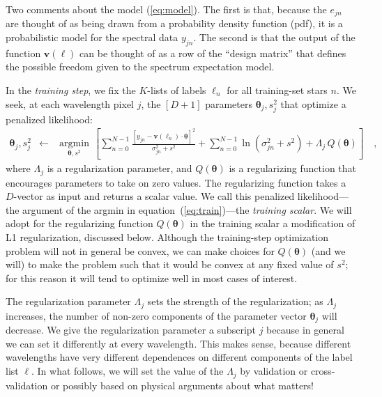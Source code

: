 \documentclass[12pt,preprint]{aastex}
\newcommand{\Dvector}[1]{\boldsymbol{#1}}
\newcommand{\vectheta}{\Dvector{\theta}}
\newcommand{\vecv}{\Dvector{v}}
\newcommand{\argmin}[1]{\underset{#1}{\operatorname{argmin}}\,}
\begin{document}
Two comments about the model (\ref{eq:model}).
The first is that, because the $e_{jn}$ are thought of as being drawn from a 
probability density function (pdf), it is a probabilistic model for the spectral
data $y_{jn}$.
The second is that the output of the function $\vecv(\ell)$ can be thought
of as a row of the ``design matrix'' that defines the possible freedom
given to the spectrum expectation model.

In the \emph{training step}, we fix the $K$-lists of labels $\ell_n$
for all training-set stars $n$.
We seek, at each wavelength pixel $j$, the $[D+1]$ parameters
$\vectheta_j,s^2_j$ that optimize a penalized likelihood:
\begin{eqnarray}\label{eq:train}
  \vectheta_j,s^2_j &\leftarrow& \argmin{\vectheta,s^2}\left[
    \sum_{n=0}^{N-1} \frac{[y_{jn}-\vecv(\ell_n)\cdot\vectheta]^2}{\sigma^2_{jn}+s^2}
    + \sum_{n=0}^{N-1} \ln(\sigma^2_{jn}+s^2)
    + \Lambda_j\,Q(\vectheta)
    \right]
  \quad ,
\end{eqnarray}
where $\Lambda_j$ is a regularization parameter, and $Q(\vectheta)$ is a 
regularizing function that encourages parameters to take on zero values.
The regularizing function takes a $D$-vector as input and returns a
scalar value.
We call this penalized likelihood---the argument of the
argmin in equation~(\ref{eq:train})---the \emph{training scalar}.
We will adopt for the regularizing function $Q(\vectheta)$ in the training scalar a
modification of L1 regularization, discussed below.
Although the training-step optimization problem will not in general be
convex, we can make choices for $Q(\vectheta)$ (and we will) to make the
problem such that it would be convex at any fixed value of $s^2$; for
this reason it will tend to optimize well in most cases of interest.

The regularization parameter $\Lambda_j$ sets the strength of the
regularization; as $\Lambda_j$ increases, the number of non-zero
components of the parameter vector $\vectheta_j$ will decrease.
We give the regularization parameter a subscript $j$ because in
general we can set it differently at every wavelength.
This makes sense, because different wavelengths have very different
dependences on different components of the label list $\ell$.
In what follows, we will set the value of the $\Lambda_j$ by
validation or cross-validation or possibly based on physical arguments
about what matters!
\end{document}
